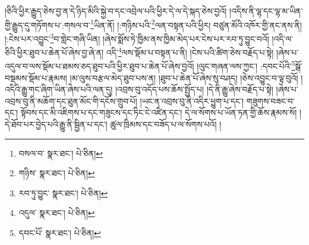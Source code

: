།ཅིའི་ཕྱིར་རྒྱུད་ཅེས་བྱ་ན་དེ་ཉིད་མིའི་སྐྱེ་བ་དང་འབྲེལ་པའི་ཕྱིར་དེ་ལ་དེ་སྐད་ཅེས་བྱའོ། །འདིས་ནི་ལྷ་དང་ལྷ་མ་ཡིན་གྱི་རྒྱུད་དུ་གཏོགས་པ་:གསལ་བ་\footnote{བསལ་བ་  སྣར་ཐང་།  པེ་ཅིན། }ཡིན་ནོ། །:གཉིས་པའི་\footnote{གཉིས་  སྣར་ཐང་།  པེ་ཅིན། }ལན་བསྟན་པའི་ཕྱིར། བཙུན་མོའི་འཁོར་གྱི་ནང་ནས་ནི། །:ངེས་པར་འབྱུང་\footnote{རབ་ཏུ་བྱུང་  སྣར་ཐང་།  པེ་ཅིན། }བ་གླེང་གཞི་ཡིན། །ཞེས་སྨོས་ཏེ་ཁྱིམ་ནས་ཁྱིམ་མེད་པར་ངེས་པར་རབ་ཏུ་བྱུང་བའོ། །འདི་ལ་ཅིའི་ཕྱིར་ཐུབ་པ་ཆེན་པོ་ཞེས་བྱ་ཞེ་ན། འདི་\footnote{འདུལ་  སྣར་ཐང་།  པེ་ཅིན། }ལས་སྡོམ་པ་བསྟན་པ་ནི། །ངེས་པའི་ཚིག་ཅེས་བརྗོད་པ་སྟེ། །ཞེས་པ་འདུལ་བ་ལས་སྡོམ་པ་ཐམས་ཅད་ཐུབ་པའི་ཕྱིར་ཐུབ་པ་ཆེན་པོ་ཞེས་བྱའོ། །ལུང་གཞན་ལས་ཀྱང་། :དབང་པོའི་\footnote{དབང་པོ་  སྣར་ཐང་།  པེ་ཅིན། }སྒོ་བསྡམས་སྡོམ་པ་རྣམས། །མ་ལུས་བརྩལ་མེད་ཐུབ་པས་ན། །ཐུབ་པ་ཆེན་པོ་ཞེས་སུ་བཤད། །ཅེས་འབྱུང་བ་ལྟ་བུའོ། །འདིའི་རྒྱུ་གང་ཞིག་ཡིན་ཞེས་པའི་ལན་དུ། །འབྲས་བུ་འདོད་པས་ཆོས་སྤྱོད་པ། །དེ་ནི་རྒྱུ་ཞེས་བརྗོད་པ་སྟེ། །ཞེས་པ་འབྲས་བུ་ནི་མཆོག་དང་ཐུན་མོང་གི་དངོས་གྲུབ་པོ། །ཡང་ན་འབྲས་བུ་ནི་འདིར་ཕྱུག་པ་དང་། གཟུགས་བཟང་བ་དང་། སྟོབས་དང་མི་འཇིགས་པ་དང་གཟུངས་དང་ཏིང་ངེ་འཛིན་དང་། དེ་ལ་སོགས་པ་ཡོན་ཏན་གྱི་ཆོས་རྣམས་སོ། །དེ་ཐོབ་པར་བྱེད་པའི་རྒྱུ་ནི་སྦྱིན་པ་དང་། ཚུལ་ཁྲིམས་དང་བཟོད་པ་ལ་སོགས་པའོ། །
